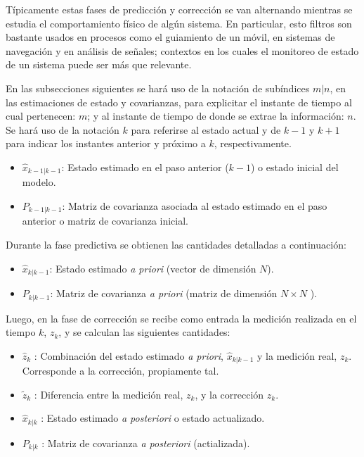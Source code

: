 T\'ipicamente estas fases de predicci\'on y correcci\'on se van alternando mientras se estudia el comportamiento f\'isico de alg\'un sistema. En particular, esto filtros son bastante usados en procesos como el guiamiento de un m\'ovil, en sistemas de navegaci\'on y en an\'alisis de se\~nales; contextos en los cuales el monitoreo de estado de un sistema puede ser m\'as que relevante.
\bigskip

En las subsecciones siguientes se har\'a uso de la notaci\'on de sub\'indices $m|n$, en las estimaciones de estado y covarianzas, para explicitar el instante de tiempo al cual pertenecen:  $m$; y al instante de tiempo de donde se extrae la informaci\'on: $n$. Se har\'a uso de la notaci\'on $k$ para referirse al estado actual y de $k-1$ y $k+1$ para indicar los instantes anterior y pr\'oximo a $k$, respectivamente.
\bigskip

\begin{itemize}
\item $\hat{x}_{k-1|k-1}$: Estado estimado en el paso anterior ($k-1$) o estado inicial del modelo.
\item $P_{k-1|k-1}$: Matriz de covarianza asociada al estado estimado en el paso anterior o matriz de covarianza inicial.
\end{itemize}
\bigskip

Durante la fase predictiva se obtienen las cantidades detalladas a continuaci\'on:
 
\begin{itemize}
\item $\hat{x}_{k|k-1}$: Estado estimado \textit{a priori} (vector de dimensi\'on $N$). 
\item $P_{k|k-1}$: Matriz de covarianza \textit{a priori} (matriz de dimensi\'on $N\times N$ ).
\end{itemize}
\bigskip

Luego, en la fase de correcci\'on se recibe como entrada la medici\'on realizada en el tiempo $k$, $z_k$, y se calculan las siguientes cantidades:

\begin{itemize}
\item $\hat{z}_k$ : Combinaci\'on del estado estimado \textit{a priori}, $\hat{x}_{k|k-1}$ y la medici\'on real, $z_k$. Corresponde a la correcci\'on, propiamente tal.
\item $\tilde{z}_k$ : Diferencia entre la medici\'on real, $z_k$, y la correcci\'on $\hat{z}_k$.
\item $\hat{x}_{k|k}$ : Estado estimado \textit{a posteriori} o estado actualizado.
\item $P_{k|k}$ : Matriz de covarianza \textit{a posteriori} (actializada).
\end{itemize}
\bigskip
 
